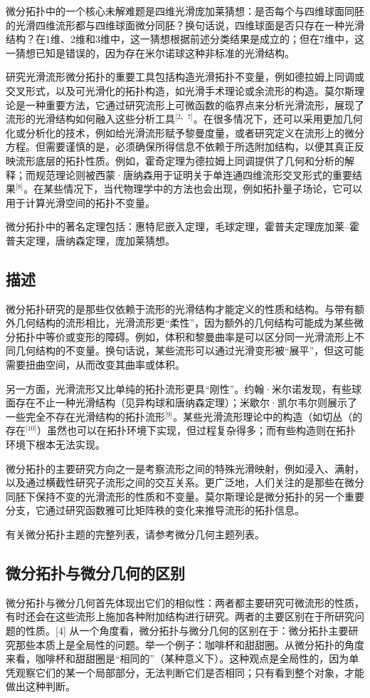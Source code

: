 微分拓扑中的一个核心未解难题是四维光滑庞加莱猜想：是否每个与四维球面同胚的光滑四维流形都与四维球面微分同胚？换句话说，四维球面是否只存在一种光滑结构？在1维、2维和3维中，这一猜想根据前述分类结果是成立的；但在7维中，这一猜想已知是错误的，因为存在米尔诺球这种非标准的光滑结构。

研究光滑流形微分拓扑的重要工具包括构造光滑拓扑不变量，例如德拉姆上同调或交叉形式，以及可光滑化的拓扑构造，如光滑手术理论或余流形的构造。莫尔斯理论是一种重要方法，它通过研究流形上可微函数的临界点来分析光滑流形，展现了流形的光滑结构如何融入这些分析工具\(^\text{[2、7]}\)。在很多情况下，还可以采用更加几何化或分析化的技术，例如给光滑流形赋予黎曼度量，或者研究定义在流形上的微分方程。但需要谨慎的是，必须确保所得信息不依赖于所选附加结构，以便其真正反映流形底层的拓扑性质。例如，霍奇定理为德拉姆上同调提供了几何和分析的解释；而规范理论则被西蒙·唐纳森用于证明关于单连通四维流形交叉形式的重要结果\(^\text{[8]}\)。在某些情况下，当代物理学中的方法也会出现，例如拓扑量子场论，它可以用于计算光滑空间的拓扑不变量。

微分拓扑中的著名定理包括：惠特尼嵌入定理，毛球定理，霍普夫定理庞加莱–霍普夫定理，唐纳森定理，庞加莱猜想。
\subsection{描述}
微分拓扑研究的是那些仅依赖于流形的光滑结构才能定义的性质和结构。与带有额外几何结构的流形相比，光滑流形更“柔性”，因为额外的几何结构可能成为某些微分拓扑中等价或变形的障碍。例如，体积和黎曼曲率是可以区分同一光滑流形上不同几何结构的不变量。换句话说，某些流形可以通过光滑变形被“展平”，但这可能需要扭曲空间，从而改变其曲率或体积。

另一方面，光滑流形又比单纯的拓扑流形更具“刚性”。约翰·米尔诺发现，有些球面存在不止一种光滑结构（见异构球和唐纳森定理）；米歇尔·凯尔韦尔则展示了一些完全不存在光滑结构的拓扑流形\(^\text{[9]}\)。某些光滑流形理论中的构造（如切丛（的存在\(^\text{[10]}\)）虽然也可以在拓扑环境下实现，但过程复杂得多；而有些构造则在拓扑环境下根本无法实现。

微分拓扑的主要研究方向之一是考察流形之间的特殊光滑映射，例如浸入、满射，以及通过横截性研究子流形之间的交互关系。更广泛地，人们关注的是那些在微分同胚下保持不变的光滑流形的性质和不变量。莫尔斯理论是微分拓扑的另一个重要分支，它通过研究函数雅可比矩阵秩的变化来推导流形的拓扑信息。

有关微分拓扑主题的完整列表，请参考微分几何主题列表。
\subsection{微分拓扑与微分几何的区别}
微分拓扑与微分几何首先体现出它们的相似性：两者都主要研究可微流形的性质，有时还会在这些流形上施加各种附加结构进行研究。两者的主要区别在于所研究问题的性质。[4] 从一个角度看，微分拓扑与微分几何的区别在于：微分拓扑主要研究那些本质上是全局性的问题。举一个例子：咖啡杯和甜甜圈。从微分拓扑的角度来看，咖啡杯和甜甜圈是“相同的”（某种意义下）。这种观点是全局性的，因为单凭观察它们的某一个局部部分，无法判断它们是否相同；只有看到整个对象，才能做出这种判断。

